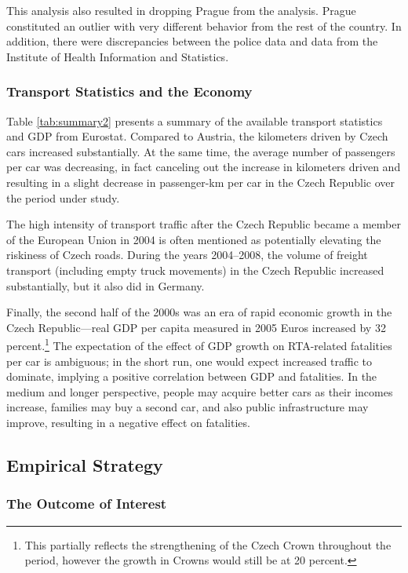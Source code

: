 \documentclass[12pt]{article}
\begin{document}
This analysis also resulted in dropping Prague from the analysis. Prague
constituted an outlier with very different behavior from the rest of the
country. In addition, there were discrepancies between the police data and data
from the Institute of Health Information and Statistics.

\subsubsection{Transport Statistics and the Economy} %

Table \ref{tab:summary2} presents a summary of the available transport
statistics and GDP from Eurostat. Compared to Austria, the kilometers driven by
Czech cars increased substantially. At the same time, the average number of
passengers per car was decreasing, in fact canceling out the increase in
kilometers driven and resulting in a slight decrease in passenger-km per car in
the Czech Republic over the period under study. 

The high intensity of transport traffic after the Czech Republic became a member
of the European Union in 2004 is often mentioned as potentially elevating the
riskiness of Czech roads. During the years 2004--2008, the volume of freight
transport (including empty truck movements) in the Czech Republic increased
substantially, but it also did in Germany.

Finally, the second half of the 2000s was an era of rapid economic growth in the
Czech Republic---real GDP per capita measured in 2005 Euros increased by 32
percent.\footnote{This partially reflects the strengthening of the Czech Crown
  throughout the period, however the growth in Crowns would still be at 20
  percent.} The expectation of the effect of GDP growth on RTA-related
fatalities per car is ambiguous; in the short run, one would expect increased
traffic to dominate, implying a positive correlation between GDP and fatalities.
In the medium and longer perspective, people may acquire better cars as their
incomes increase, families may buy a second car, and also public infrastructure
may improve, resulting in a negative effect on fatalities.

\subsection{Empirical Strategy} %
\label{subsec:estimator}

\subsubsection{The Outcome of Interest} %
\end{document}
